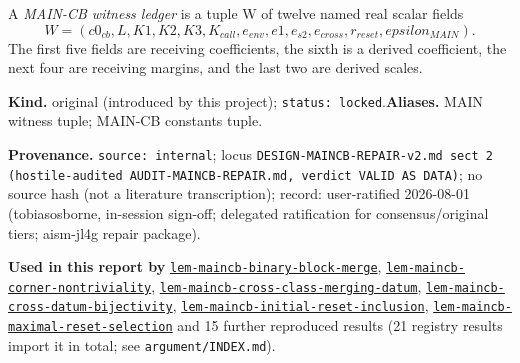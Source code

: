 \hypertarget{def:maincb-witness-ledger}{}%
\begin{definition}\label{def:maincb-witness-ledger}
A \emph{MAIN-CB witness ledger} is a tuple W of twelve named real scalar fields
\[
W=(c0_{cb},L,K1,K2,K3,K_{call},e_{env},e1,e_{s2},e_{cross},r_{reset},epsilon_{MAIN}).
\]
The first five fields are receiving coefficients, the sixth is a derived coefficient, the next four are receiving margins, and the last two are derived scales.
\end{definition}
\begin{defnote}
\textbf{Kind.} original (introduced by this project); \texttt{status: locked}.\quad\textbf{Aliases.} MAIN witness tuple; MAIN-CB constants tuple.
\par
\textbf{Provenance.} \texttt{source: internal}; locus \texttt{DESIGN-\allowbreak{}MAINCB-\allowbreak{}REPAIR-\allowbreak{}v2.\allowbreak{}md sect 2 (hostile-\allowbreak{}audited AUDIT-\allowbreak{}MAINCB-\allowbreak{}REPAIR.\allowbreak{}md,\allowbreak{} verdict VALID AS DATA)}; no source hash (not a literature transcription); record: user-\allowbreak{}ratified 2026-\allowbreak{}08-\allowbreak{}01 (tobiasosborne,\allowbreak{} in-\allowbreak{}session sign-\allowbreak{}off;\allowbreak{} delegated ratification for consensus/\allowbreak{}original tiers;\allowbreak{} aism-\allowbreak{}jl4g repair package).
\par
\textbf{Used in this report by} \hyperref[lem:maincb-binary-block-merge]{\texttt{lem-\allowbreak{}maincb-\allowbreak{}binary-\allowbreak{}block-\allowbreak{}merge}}, \hyperref[lem:maincb-corner-nontriviality]{\texttt{lem-\allowbreak{}maincb-\allowbreak{}corner-\allowbreak{}nontriviality}}, \hyperref[lem:maincb-cross-class-merging-datum]{\texttt{lem-\allowbreak{}maincb-\allowbreak{}cross-\allowbreak{}class-\allowbreak{}merging-\allowbreak{}datum}}, \hyperref[lem:maincb-cross-datum-bijectivity]{\texttt{lem-\allowbreak{}maincb-\allowbreak{}cross-\allowbreak{}datum-\allowbreak{}bijectivity}}, \hyperref[lem:maincb-initial-reset-inclusion]{\texttt{lem-\allowbreak{}maincb-\allowbreak{}initial-\allowbreak{}reset-\allowbreak{}inclusion}}, \hyperref[lem:maincb-maximal-reset-selection]{\texttt{lem-\allowbreak{}maincb-\allowbreak{}maximal-\allowbreak{}reset-\allowbreak{}selection}} and 15 further reproduced results (21 registry results import it in total; see \texttt{argument/INDEX.md}).

\end{defnote}
